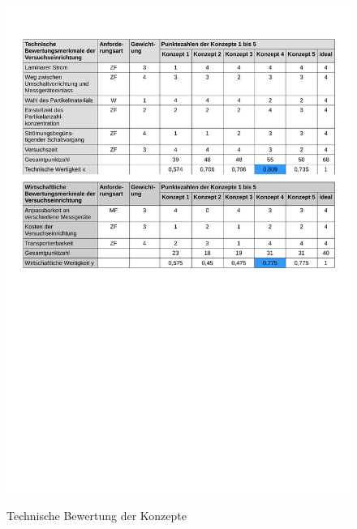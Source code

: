 \begin{figure}[H]
        \myfloatalign
        {\includegraphics[width=.8\linewidth]{gfx/conclusion/TabEvalTwo.pdf}} \quad
        \caption[Technische Bewertung der Konzepte]
        {Technische Bewertung der Konzepte}
        \label{fig:TabEvalTwo}
\end{figure}
